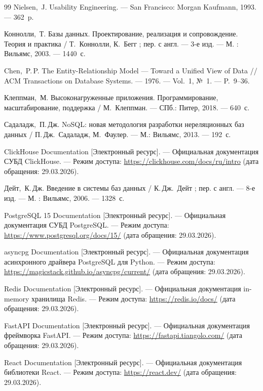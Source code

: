 \begin{thebibliography}{99}
	Nielsen,~J. Usability Engineering. --- San Francisco: Morgan Kaufmann, 1993. ---
	362~p.

	Коннолли,~Т. Базы данных. Проектирование, реализация и сопровождение.
	Теория и практика / Т.~Коннолли, К.~Бегг ; пер. с англ. --- 3-е изд. ---
	М. : Вильямс, 2003. --- 1440~с.

	Chen,~P.\,P. The Entity-Relationship Model --- Toward a Unified View of Data //
	ACM Transactions on Database Systems. --- 1976. --- Vol.~1, №~1. ---
	P.~9--36.

	Клеппман,~М. Высоконагруженные приложения. Программирование,
	масштабирование, поддержка / М.~Клеппман. --- СПб.: Питер, 2018. --- 640~с.

	Садаладж,~П.\,Дж. NoSQL: новая методология разработки нереляционных баз
	данных / П.\,Дж.~Садаладж, М.~Фаулер. --- М.: Вильямс, 2013. --- 192~с.

	ClickHouse Documentation [Электронный ресурс]. --- Официальная документация
	СУБД ClickHouse. --- Режим доступа: \url{https://clickhouse.com/docs/ru/intro}
	(дата обращения: 29.03.2026).

	Дейт,~К.\,Дж. Введение в системы баз данных / К.\,Дж.~Дейт ; пер. с
	англ. --- 8-е изд. --- М. : Вильямс, 2006. --- 1328~с.

	PostgreSQL 15 Documentation [Электронный ресурс]. --- Официальная
	документация СУБД PostgreSQL. --- Режим доступа:
	\url{https://www.postgresql.org/docs/15/}
	(дата обращения: 29.03.2026).

	asyncpg Documentation [Электронный ресурс]. --- Официальная документация
	асинхронного драйвера PostgreSQL для Python. --- Режим доступа:
	\url{https://magicstack.github.io/asyncpg/current/}
	(дата обращения: 29.03.2026).

	Redis Documentation [Электронный ресурс]. --- Официальная документация
	in-memory хранилища Redis. --- Режим доступа: \url{https://redis.io/docs/}
	(дата обращения: 29.03.2026).

	FastAPI Documentation [Электронный ресурс]. --- Официальная документация
	фреймворка FastAPI. --- Режим доступа: \url{https://fastapi.tiangolo.com/}
	(дата обращения: 29.03.2026).

	React Documentation [Электронный ресурс]. --- Официальная документация
	библиотеки React. --- Режим доступа: \url{https://react.dev/}
	(дата обращения: 29.03.2026).


\end{thebibliography}
